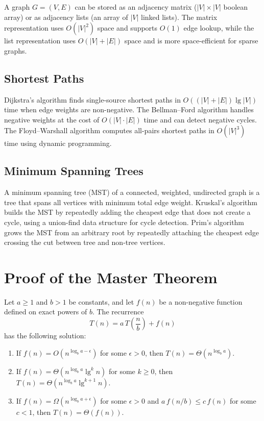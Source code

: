 \documentclass[
    language=english,
    doctype=book,
    institution=none,
    titlestyle=book
]{../../omnilatex}
\begin{document}
A graph $G = (V, E)$ can be stored as an adjacency matrix ($|V| \times |V|$ boolean array) or as adjacency lists (an array of $|V|$ linked lists). The matrix representation uses $O(|V|^2)$ space and supports $O(1)$ edge lookup, while the list representation uses $O(|V| + |E|)$ space and is more space-efficient for sparse graphs.

\section{Shortest Paths}

Dijkstra's algorithm finds single-source shortest paths in $O((|V| + |E|) \lg |V|)$ time when edge weights are non-negative. The Bellman--Ford algorithm handles negative weights at the cost of $O(|V| \cdot |E|)$ time and can detect negative cycles. The Floyd--Warshall algorithm computes all-pairs shortest paths in $O(|V|^3)$ time using dynamic programming.

\section{Minimum Spanning Trees}

A minimum spanning tree (MST) of a connected, weighted, undirected graph is a tree that spans all vertices with minimum total edge weight. Kruskal's algorithm builds the MST by repeatedly adding the cheapest edge that does not create a cycle, using a union-find data structure for cycle detection. Prim's algorithm grows the MST from an arbitrary root by repeatedly attaching the cheapest edge crossing the cut between tree and non-tree vertices.

\appendix
\chapter{Proof of the Master Theorem}\label{app:master}

\begin{theorem}
Let $a \geq 1$ and $b > 1$ be constants, and let $f(n)$ be a non-negative function defined on exact powers of $b$. The recurrence
\[
T(n) = a\,T\!\left(\frac{n}{b}\right) + f(n)
\]
has the following solution:
\begin{enumerate}
    \item If $f(n) = O(n^{\log_b a - \epsilon})$ for some $\epsilon > 0$, then $T(n) = \Theta(n^{\log_b a})$.
    \item If $f(n) = \Theta(n^{\log_b a} \lg^k n)$ for some $k \geq 0$, then $T(n) = \Theta(n^{\log_b a} \lg^{k+1} n)$.
    \item If $f(n) = \Omega(n^{\log_b a + \epsilon})$ for some $\epsilon > 0$ and $a\,f(n/b) \leq c\,f(n)$ for some $c < 1$, then $T(n) = \Theta(f(n))$.
\end{enumerate}
\end{theorem}
\end{document}
